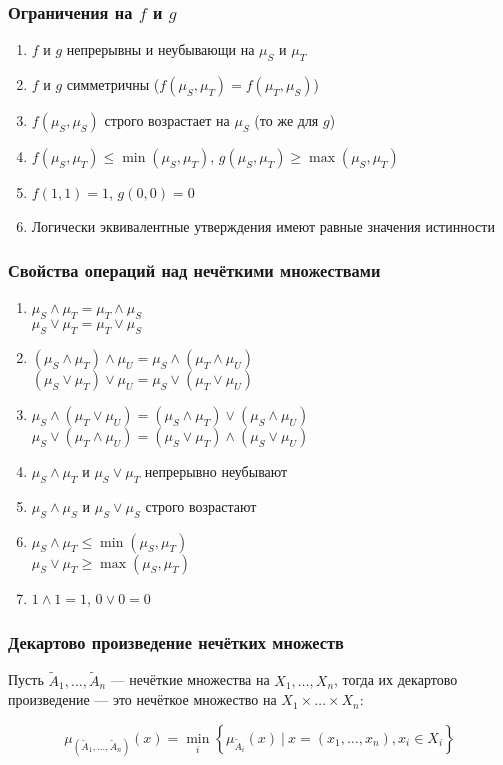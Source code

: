 \documentclass{beamer}
\begin{document}
\begin{frame}\frametitle{Ограничения на $f$ и $g$}
    \begin{enumerate}
        \item $f$ и $g$ непрерывны и неубывающи на $\mu_S$ и $\mu_T$
        \item $f$ и $g$ симметричны ($f(\mu_S,\mu_T) = f(\mu_T,\mu_S)$)
        \item $f(\mu_S, \mu_S)$ строго возрастает на $\mu_S$ (то же для $g$)
        \item $f(\mu_S, \mu_T) \leq \min{(\mu_S, \mu_T)}$, $g(\mu_S, \mu_T) \geq \max{(\mu_S, \mu_T)}$
        \item $f(1, 1) = 1$, $g(0, 0) = 0$
        \item Логически эквивалентные утверждения имеют равные значения истинности
    \end{enumerate}
\end{frame}

\begin{frame}\frametitle{Свойства операций над нечёткими множествами}
    \begin{enumerate}
        \item $\mu_S \wedge \mu_T = \mu_T \wedge \mu_S$ \\ $\mu_S \vee \mu_T = \mu_T \vee \mu_S$
        \item $(\mu_S \wedge \mu_T) \wedge \mu_U = \mu_S \wedge (\mu_T \wedge \mu_U)$ \\ $(\mu_S \vee \mu_T) \vee \mu_U = \mu_S \vee (\mu_T \vee \mu_U)$
        \item $\mu_S \wedge (\mu_T \vee \mu_U) = (\mu_S \wedge \mu_T) \vee (\mu_S \wedge \mu_U)$ \\ $\mu_S \vee (\mu_T \wedge \mu_U) = (\mu_S \vee \mu_T) \wedge (\mu_S \vee \mu_U)$
        \item $\mu_S \wedge \mu_T$ и $\mu_S \vee \mu_T$ непрерывно неубывают
        \item $\mu_S \wedge \mu_S$ и $\mu_S \vee \mu_S$ строго возрастают
        \item $\mu_S \wedge \mu_T \leq \min{ (\mu_S, \mu_T) }$ \\ $\mu_S \vee \mu_T \geq \max{ (\mu_S, \mu_T) }$
        \item $1\wedge 1 = 1$, $0 \vee 0 = 0$
    \end{enumerate}
\end{frame}

\begin{frame}\frametitle{Декартово произведение нечётких множеств}
    \begin{definition}
        Пусть $\tilde A_1, \dots, \tilde{A}_n$ --- нечёткие множества на $X_1, \dots, X_n$, тогда их декартово произведение --- это нечёткое множество на $X_1 \times \dots \times X_n$:
        
        $$ 
        \mu_{(\tilde A_1, \dots, \tilde{A}_n)}(x) = \min\limits_i \left\{ \mu_{\tilde{A}_i}(x)\ |\ x = (x_1, \dots, x_n), x_i \in X_i \right\}
        $$
    \end{definition}
\end{frame}
\end{document}

